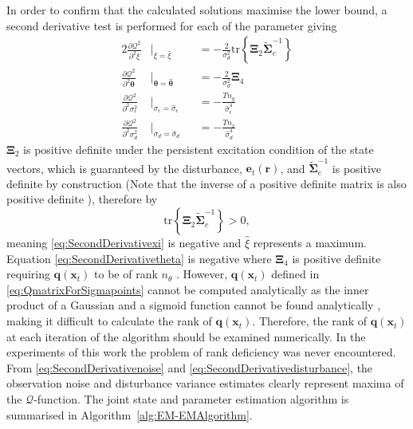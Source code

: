 \documentclass[]{article}
\begin{document}
In order to confirm that the calculated solutions maximise the lower bound, a second derivative test is performed for each of the parameter giving
\begin{alignat}{2}%
 \frac{\partial \mathcal Q^2}{\partial^2\xi}&\biggr\rvert_{\xi=\hat{\xi}}&&=-\frac{2}{\sigma_d^2}\mathrm{tr}\left\lbrace \boldsymbol\Xi_2 \tilde{\boldsymbol\Sigma}_e^{-1}\right\rbrace \label{eq:SecondDerivativexi}\\
 \frac{\partial \mathcal Q^2}{\partial^2\boldsymbol\theta}&\biggr\rvert_{\boldsymbol\theta=\hat{\boldsymbol\theta}}&&=-\frac{2}{\sigma_d^2}\boldsymbol\Xi_4 \label{eq:SecondDerivativetheta} \\
 \frac{\partial \mathcal Q^2}{\partial^2\sigma_{\epsilon}^2}&\biggr\rvert_{\sigma_{\epsilon}=\hat{\sigma}_{\epsilon}}&&=-\frac{Tn_y}{\hat{\sigma}_{\epsilon}^4} \label{eq:SecondDerivativenoise} \\
 \frac{\partial \mathcal Q^2}{\partial^2\sigma_{d}^2}&\biggr\rvert_{{\sigma}_{d}=\hat{\sigma}_{d}}&&= -\frac{Tn_x}{\hat{\sigma}_{d}^4} \label{eq:SecondDerivativedisturbance}
\end{alignat}
$\boldsymbol\Xi_2$ is positive definite under the persistent excitation condition of the state vectors, which is guaranteed by the disturbance, $\mathbf{e}_t(\mathbf r)$, and $\tilde{\boldsymbol\Sigma}_e^{-1}$ is positive definite by construction (Note that the inverse of a positive definite matrix is also positive definite \cite{Horn2005}), therefore by \cite{Coope1994}
\begin{equation}\label{eq:EM-traceinequality}
 \mathrm{tr}\left\lbrace \boldsymbol\Xi_2 \tilde{\boldsymbol\Sigma}_e^{-1}\right\rbrace >0,
\end{equation}
meaning \eqref{eq:SecondDerivativexi} is negative and $\hat{\xi}$ represents a maximum. Equation \eqref{eq:SecondDerivativetheta} is negative where $\boldsymbol\Xi_4$ is positive definite requiring $\mathbf q(\mathbf x_t)$ to be of rank $n_{\theta}$ \cite{Golub1996}.  However, $\mathbf q(\mathbf x_t)$ defined in \eqref{eq:QmatrixForSigmapoints} cannot be computed analytically as the inner product of a Gaussian and a sigmoid function cannot be found analytically \cite{MacKay1992}, making it difficult to calculate the rank of $\mathbf q(\mathbf x_t)$. Therefore, the rank of $\mathbf q(\mathbf x_t)$ at each iteration of the algorithm should be examined numerically. In the experiments of this work the problem of rank deficiency was never encountered. From \eqref{eq:SecondDerivativenoise} and \eqref{eq:SecondDerivativedisturbance}, the observation noise and disturbance variance estimates clearly represent maxima of the $\mathcal{Q}$-function. The joint state and parameter estimation algorithm is summarised in Algorithm~\ref{alg:EM-EMAlgorithm}.
\end{document}
